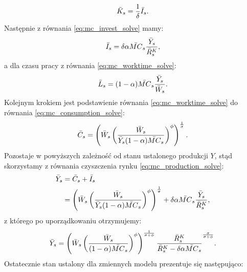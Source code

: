 \begin{equation}
    \bar{K}_s = \frac{1}{\delta} \bar{I}_s.
\end{equation}
Następnie z równania \eqref{eq:mc_invest_solve} mamy:
\begin{equation}
    \bar{I}_s = \delta \alpha \bar{MC}_s \frac{\bar{Y}_s}{\bar{R}_s^K},
\end{equation}
a dla czasu pracy z równania \eqref{eq:mc_worktime_solve}:
\begin{equation}
    \bar{L}_s = (1-\alpha)\bar{MC}_s\frac{\bar{Y}_s}{\bar{W}_s}.
\end{equation}
Kolejnym krokiem jest podstawienie równania \eqref{eq:mc_worktime_solve} do równania \eqref{eq:mc_consumption_solve}:
\begin{equation}
    \bar{C}_s = \left( \bar{W}_s \left( \frac{\bar{W}_s}{\bar{Y}_s(1-\alpha)\bar{MC}_s}\right)^\phi\right)^{\frac{1}{\sigma}}.
\end{equation}
Pozostaje w powyższych zależność od stanu ustalonego produkcji $Y$, stąd skorzystamy z równania czyszczenia rynku \eqref{eq:mc_production_solve}:
\begin{align}
    \bar{Y}_s &= \bar{C}_s + \bar{I}_s \\ 
    &= \left( \bar{W}_s \left( \frac{\bar{W}_s}{\bar{Y}_s(1-\alpha)\bar{MC}_s}\right)^\phi\right)^{\frac{1}{\sigma}} + \delta \alpha \bar{MC}_s \frac{\bar{Y}_s}{\bar{R}_s^K},
\end{align}
z którego po uporządkowaniu otrzymujemy:
\begin{equation}
    \bar{Y}_s = \left( \bar{W}_s \left( \frac{\bar{W}_s}{(1-\alpha)\bar{MC}_s}\right)^\phi\right)^{\frac{1}{\sigma + \phi}} \frac{\bar{R}_s^K}{\bar{R}_s^K - \delta \alpha \bar{MC}_s}^{\frac{\sigma}{\sigma + \phi}}.
\end{equation}
Ostatecznie stan ustalony dla zmiennych modelu prezentuje się następująco:
